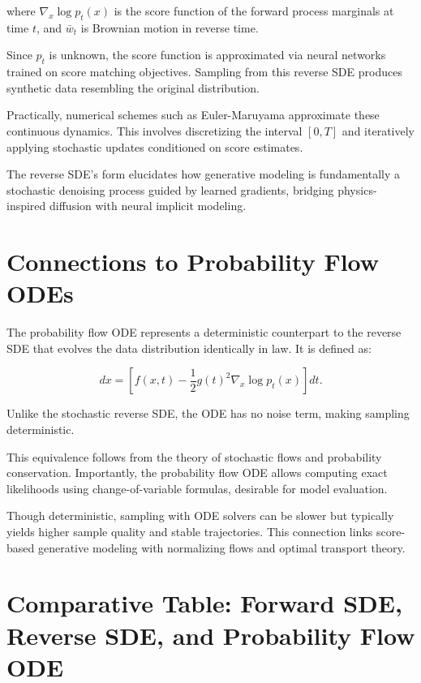 where \( \nabla_x \log p_t(x) \) is the score function of the forward process marginals at time \( t \), and \( \bar{w}_t \) is Brownian motion in reverse time.

Since \( p_t \) is unknown, the score function is approximated via neural networks trained on score matching objectives. Sampling from this reverse SDE produces synthetic data resembling the original distribution.

Practically, numerical schemes such as Euler-Maruyama approximate these continuous dynamics. This involves discretizing the interval \( [0, T] \) and iteratively applying stochastic updates conditioned on score estimates.

The reverse SDE’s form elucidates how generative modeling is fundamentally a stochastic denoising process guided by learned gradients, bridging physics-inspired diffusion with neural implicit modeling.

\section{Connections to Probability Flow ODEs}

The probability flow ODE represents a deterministic counterpart to the reverse SDE that evolves the data distribution identically in law. It is defined as:

\[
dx = \left[ f(x,t) - \frac{1}{2} g(t)^2 \nabla_x \log p_t(x) \right] dt.
\]

Unlike the stochastic reverse SDE, the ODE has no noise term, making sampling deterministic.

This equivalence follows from the theory of stochastic flows and probability conservation. Importantly, the probability flow ODE allows computing exact likelihoods using change-of-variable formulas, desirable for model evaluation.

Though deterministic, sampling with ODE solvers can be slower but typically yields higher sample quality and stable trajectories. This connection links score-based generative modeling with normalizing flows and optimal transport theory.

\section{Comparative Table: Forward SDE, Reverse SDE, and Probability Flow ODE}

